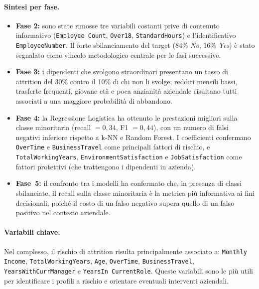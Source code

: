 \documentclass{article}
\begin{document}
\paragraph{Sintesi per fase.}
\begin{itemize}
  \item \textbf{Fase 2:} sono state rimosse tre variabili costanti prive di contenuto
    informativo (\texttt{Employee Count}, \texttt{Over18}, \texttt{StandardHours})
    e l'identificativo \texttt{EmployeeNumber}. Il forte sbilanciamento del target
    (84\% \emph{No}, 16\% \emph{Yes}) è stato segnalato come vincolo metodologico
    centrale per le fasi successive.
 
  \item \textbf{Fase 3:} i dipendenti che svolgono straordinari presentano un tasso di
    attrition del 30\% contro il 10\% di chi non li svolge; redditi mensili bassi,
    trasferte frequenti, giovane età e poca anzianità aziendale risultano tutti
    associati a una maggiore probabilità di abbandono.
 
  \item \textbf{Fase 4:} la Regressione Logistica ha ottenuto le prestazioni migliori
    sulla classe minoritaria (recall $= 0{,}34$, F1 $= 0{,}44$), con un numero di
    falsi negativi inferiore rispetto a k-NN e Random Forest. I coefficienti confermano
    \texttt{OverTime} e \texttt{BusinessTravel} come principali fattori di rischio,
    e \texttt{TotalWorkingYears}, \texttt{EnvironmentSatisfaction} e
    \texttt{JobSatisfaction} come fattori protettivi (che trattengono i dipendenti in azienda).
 
  \item \textbf{Fase~5:} il confronto tra i modelli ha confermato che, in presenza di
    classi sbilanciate, il recall sulla classe minoritaria è la metrica più informativa
    ai fini decisionali, poiché il costo di un falso negativo supera quello di un
    falso positivo nel contesto aziendale.
\end{itemize}
 
\paragraph{Variabili chiave.}
Nel complesso, il rischio di attrition risulta principalmente associato a:
\texttt{Monthly Income}, \texttt{TotalWorkingYears}, \texttt{Age}, \texttt{OverTime},
\texttt{BusinessTravel}, \texttt{YearsWithCurrManager} e \texttt{YearsIn CurrentRole}.
Queste variabili sono le più utili per identificare i profili a rischio e orientare
eventuali interventi aziendali.
 
\end{document}
